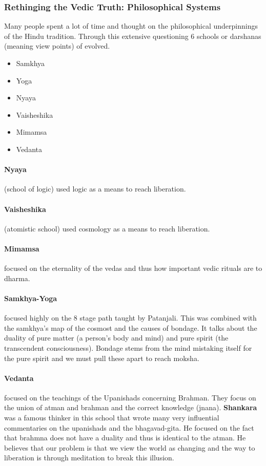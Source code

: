 \documentclass{article}
\begin{document}
\subsubsection{Rethinging the Vedic Truth: Philosophical Systems}
\label{ssub:rethinging_the_vedic_truth_philosophical_systems}
Many people spent a lot of time and thought on the philosophical underpinnings of the Hindu tradition. Through this extensive questioning 6 schools or darshanas (meaning view points) of evolved.
\begin{itemize}
	\item Samkhya
	\item Yoga
	\item Nyaya
	\item Vaisheshika
	\item Mimamsa
	\item Vedanta
\end{itemize}

\paragraph{Nyaya}
\label{par:nyaya}
(school of logic) used logic as a means to reach liberation.

\paragraph{Vaisheshika}
\label{par:vaisheshika}
(atomistic school) used cosmology as a means to reach liberation.

\paragraph{Mimamsa}
\label{par:mimamsa}
focused on the eternality of the vedas and thus how important vedic rituals are to dharma.

\paragraph{Samkhya-Yoga}
\label{par:samkhya_yoga}
focused highly on the 8 stage path taught by Patanjali. This was combined with the samkhya's map of the cosmost and the causes of bondage. It talks about the duality of pure matter (a person's body and mind) and pure spirit (the transcendent consciousness). Bondage stems from the mind mistaking itself for the pure spirit and we must pull these apart to reach moksha.

\paragraph{Vedanta}
\label{par:vedanta}
focused on the teachings of the Upanishads concerning Brahman. They focus on the union of atman and brahman and the correct knowledge (jnana). \textbf{Shankara} was a famous thinker in this school that wrote many very influential commentaries on the upanishads and the bhagavad-gita. He focused on the fact that brahmna does not have a duality and thus is identical to the atman. He believes that our problem is that we view the world as changing and the way to liberation is through meditation to break this illusion.
\end{document}
